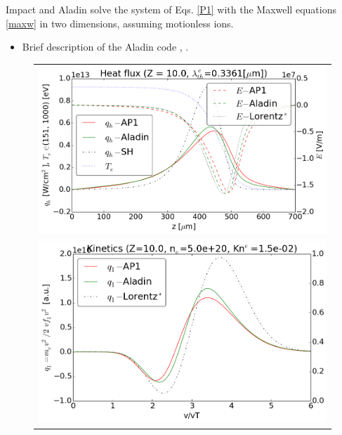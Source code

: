 Impact and Aladin solve the system of Eqs. \eqref{P1} with the Maxwell equations  \eqref{maxw} in two dimensions, assuming motionless ions.


\begin{itemize}
  \item Brief description of the Aladin code , . %
\end{itemize}


\begin{figure}[tbh]
  \begin{center}
    \begin{tabular}{c}
      \includegraphics[width=\figscale\textwidth]{../VFPdata/C7_Aladin_case3_heatflux.png} \\
      \includegraphics[width=\figscale\textwidth]{../VFPdata/C7_Aladin_case3_kinetics.png} \\

\end{tabular}
\end{center}
\end{figure}
